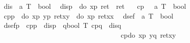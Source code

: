 \begin{isabellebody}
\isamarkuptrue%
\isanewline
{}\isanewline
\ \ dis\ {\isacharcolon}{\isacharcolon}\ {\isachardoublequote}{\isacharprime}a\ T\ {\isasymRightarrow}\ bool{\isachardoublequote}\isanewline
\ \ {\isachardoublequote}dis{\isacharparenleft}p{\isacharparenright}\ {\isasymequiv}\ {\isacharparenleft}do\ {\isacharbraceleft}x{\isasymleftarrow}p{\isacharsemicolon}\ ret{\isacharparenleft}{\isacharparenright}{\isacharbraceright}{\isacharparenright}\ {\isacharequal}\ ret\ {\isacharparenleft}{\isacharparenright}{\isachardoublequote}\isanewline
\isanewline
\ \ cp\ \ {\isacharcolon}{\isacharcolon}\ {\isachardoublequote}{\isacharprime}a\ T\ {\isasymRightarrow}\ bool{\isachardoublequote}\isanewline
\ \ {\isachardoublequote}cp{\isacharparenleft}p{\isacharparenright}\ {\isasymequiv}\ {\isacharparenleft}do\ {\isacharbraceleft}x{\isasymleftarrow}p{\isacharsemicolon}\ y{\isasymleftarrow}p{\isacharsemicolon}\ ret{\isacharparenleft}x{\isacharcomma}y{\isacharparenright}{\isacharbraceright}{\isacharparenright}\ {\isacharequal}\ {\isacharparenleft}do\ {\isacharbraceleft}x{\isasymleftarrow}p{\isacharsemicolon}\ ret{\isacharparenleft}x{\isacharcomma}x{\isacharparenright}{\isacharbraceright}{\isacharparenright}{\isachardoublequote}\isanewline
\isanewline
\ \ dsef\ {\isacharcolon}{\isacharcolon}\ {\isachardoublequote}{\isacharprime}a\ T\ {\isasymRightarrow}\ bool{\isachardoublequote}\isanewline
\ \ {\isachardoublequote}dsef{\isacharparenleft}p{\isacharparenright}\ {\isasymequiv}\ cp{\isacharparenleft}p{\isacharparenright}\ {\isasymand}\ dis{\isacharparenleft}p{\isacharparenright}\ {\isasymand}\ {\isacharparenleft}{\isasymforall}q{\isacharcolon}{\isacharcolon}bool\ T{\isachardot}\ cp{\isacharparenleft}q{\isacharparenright}\ {\isasymand}\ dis{\isacharparenleft}q{\isacharparenright}\ {\isasymlongrightarrow}\ \isanewline
\ \ \ \ \ \ \ \ \ \ \ \ \ \ \ \ \ \ \ \ \ \ \ \ \ \ \ \ \ \ \ \ \ \ \ \
cp{\isacharparenleft}do\
{\isacharbraceleft}x{\isasymleftarrow}p{\isacharsemicolon}\
y{\isasymleftarrow}q{\isacharsemicolon}\
ret{\isacharparenleft}x{\isacharcomma}y{\isacharparenright}{\isacharbraceright}{\isacharparenright}{\isacharparenright}{\isachardoublequote}\isanewline
\end{isabellebody}

